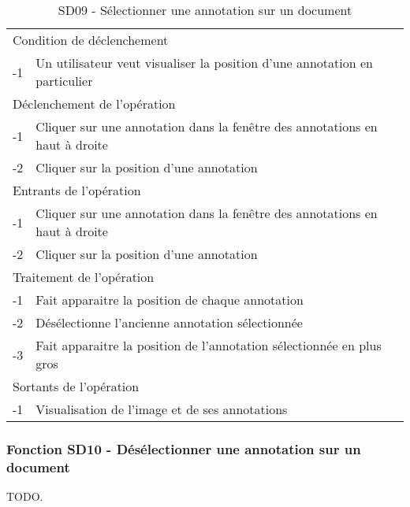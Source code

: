 \documentclass[a4paper]{article}
\begin{document}
\begin{table}[H]
  \centering
   \small
	\begin{tabular}{|c|p{12cm}|}
   		\hline
   			\rowcolor{lightgray}\multicolumn{2}{|c|}{\textbf{SD09 - Sélectionner une annotation sur un document}} \\
   		\hline
   			\multicolumn{2}{|l|}{Condition de d\'eclenchement} \\
   		\hline
   			-1 & Un utilisateur veut visualiser la position d’une annotation en particulier\\
   		\hline
   			\multicolumn{2}{|l|}{D\'eclenchement de l'op\'eration} \\
   		\hline
   			-1 & Cliquer sur une annotation dans la fenêtre des annotations en haut à droite\\
            -2 & Cliquer sur la position d'une annotation\\
   		\hline
   			\multicolumn{2}{|l|}{Entrants de l'op\'eration} \\
   		\hline
   			-1 & Cliquer sur une annotation dans la fenêtre des annotations en haut à droite\\
            -2 & Cliquer sur la position d'une annotation\\
   		\hline
   			\multicolumn{2}{|l|}{Traitement de l'op\'eration} \\
  		\hline
   			-1 & Fait apparaitre la position de chaque annotation\\
			-2 & Désélectionne l’ancienne annotation sélectionnée\\
			-3 & Fait apparaitre la position de l’annotation sélectionnée en plus gros\\
   		\hline
   			\multicolumn{2}{|l|}{Sortants de l'op\'eration} \\
   		\hline
   			-1 & Visualisation de l’image et de ses annotations\\
   		\hline
	\end{tabular}
  \caption{SD09 - Sélectionner une annotation sur un document}
  \normalsize
  \label{tab:selectionner_annotation}
\end{table}

\subsubsection{Fonction SD10 - Désélectionner une annotation sur un document}
TODO.\\
\end{document}
